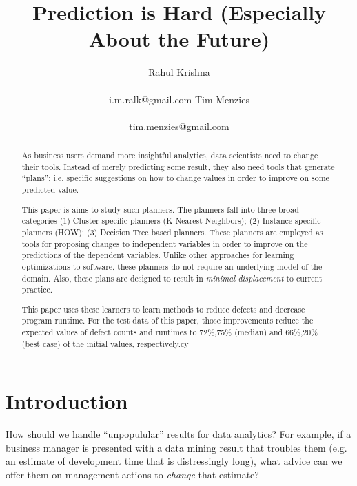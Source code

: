 \documentclass{sig-alternate}
\begin{document}
  

\title{Prediction is Hard (Especially About the Future)}
\author{
\alignauthor 
Rahul Krishna \\
       \\
       {i.m.ralk@gmail.com}
\alignauthor
Tim Menzies\\
       \\
       {tim.menzies@gmail.com}}
\setlength{\columnsep}{7mm}

\maketitle
\begin{abstract}
 As business users demand more insightful
 analytics, data scientists need to change
 their tools. Instead of merely predicting 
 some result, they also need tools that generate ``plans'';
 i.e. specific suggestions on  how to change values in order to
 improve on some predicted value.
 
 This paper is aims to study such planners. The planners fall into three broad categories (1) Cluster specific planners (K Nearest Neighbors); (2) Instance specific planners (HOW); (3) Decision Tree based planners. These planners are employed as tools for proposing changes to independent
 variables in order to improve on 
 the predictions of the dependent variables. Unlike other approaches
 for learning optimizations to software, these planners do not require
 an underlying model of the domain. Also, these plans
 are designed to result in {\em minimal displacement}
 to current practice.
 
 This paper uses these learners to learn methods
 to reduce defects and decrease program runtime.
 For the test data of this paper, those improvements   reduce
 the expected values of defect counts and  runtimes to    
 72\%,75\%  (median) and 66\%,20\% (best case) of the initial values, respectively.cy
\end{abstract}
\section{Introduction}
	How should we handle ``unpopulular'' results
	for data analytics? For example, if a business manager is presented
	with a data mining result that troubles them (e.g. an estimate of
	development time that is distressingly long), what advice
	can we offer them on management actions to {\em change} that estimate?
	
\end{document}
